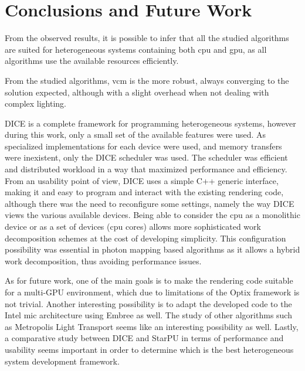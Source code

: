 \chapter{Conclusions and Future Work}








From the observed results, it is possible to infer that all the studied algorithms are suited for heterogeneous systems containing both \gls{cpu} and \gls{gpu}, as all algorithms use the available resources efficiently.

From the studied algorithms, \gls{vcm} is the more robust, always converging to the solution expected, although with a slight overhead when not dealing with complex lighting.

DICE is a complete framework for programming heterogeneous systems, however during this work, only a small set of the available features were used. As specialized implementations for each device were used, and memory transfers were inexistent, only the DICE scheduler was used. The scheduler was efficient and distributed workload in a way that maximized performance and efficiency. From an usability point of view, DICE uses a simple C++ generic interface, making it and easy to program and interact with the existing rendering code, although there was the need to reconfigure some settings, namely the way DICE views the various available devices. Being able to consider the \gls{cpu} as a monolithic device or as a set of devices (\gls{cpu} cores) allows more sophisticated work decomposition schemes at the cost of developing simplicity. This configuration possibility was essential in photon mapping based algorithms as it allows a hybrid work decomposition, thus avoiding performance issues.

As for future work, one of the main goals is to make the rendering code suitable for a multi-GPU environment, which due to limitations of the Optix framework is not trivial. Another interesting possibility is to adapt the developed code to the Intel \gls{mic} architecture using Embree as well. The study of other algorithms such as Metropolis Light Transport seems like an interesting possibility as well. Lastly, a comparative study between DICE and StarPU in terms of performance and usability seems important in order to determine which is the best heterogeneous system development framework.